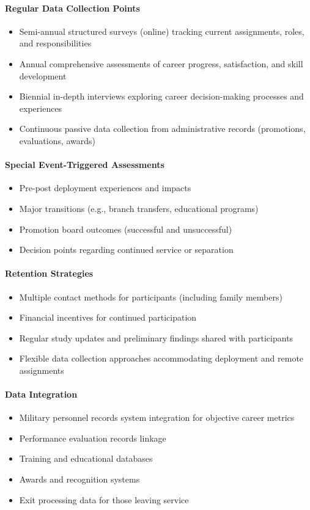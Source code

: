 \documentclass[../main.tex]{subfiles}
\begin{document}
\paragraph{Regular Data Collection Points}
\begin{itemize}
\item Semi-annual structured surveys (online) tracking current assignments, roles, and responsibilities
\item Annual comprehensive assessments of career progress, satisfaction, and skill development
\item Biennial in-depth interviews exploring career decision-making processes and experiences
\item Continuous passive data collection from administrative records (promotions, evaluations, awards)
\end{itemize}

\paragraph{Special Event-Triggered Assessments}
\begin{itemize}
\item Pre-post deployment experiences and impacts
\item Major transitions (e.g., branch transfers, educational programs)
\item Promotion board outcomes (successful and unsuccessful)
\item Decision points regarding continued service or separation
\end{itemize}

\paragraph{Retention Strategies}
\begin{itemize}
\item Multiple contact methods for participants (including family members)
\item Financial incentives for continued participation
\item Regular study updates and preliminary findings shared with participants
\item Flexible data collection approaches accommodating deployment and remote assignments
\end{itemize}

\paragraph{Data Integration}
\begin{itemize}
\item Military personnel records system integration for objective career metrics
\item Performance evaluation records linkage
\item Training and educational databases
\item Awards and recognition systems
\item Exit processing data for those leaving service
\end{itemize}
\end{document}
